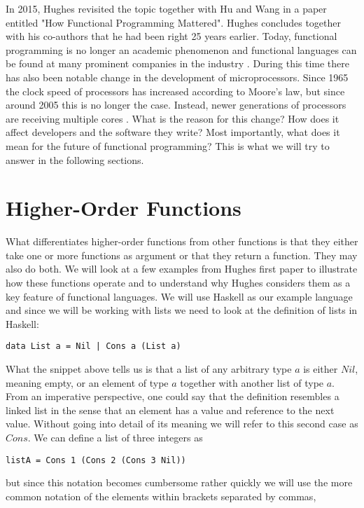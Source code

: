 \documentclass[conference]{IEEEtran}
\begin{document}
In 2015, Hughes revisited the topic together with Hu and Wang in a paper entitled "How Functional Programming Mattered". Hughes concludes together with his co-authors that he had been right 25 years earlier. Today, functional programming is no longer an academic phenomenon and functional languages can be found at many prominent companies in the industry \cite{how}. During this time there has also been notable change in the development of microprocessors. Since 1965 the clock speed of processors has increased according to Moore's law, but since around 2005 this is no longer the case. Instead, newer generations of processors are receiving multiple cores \cite{proc}. What is the reason for this change? How does it affect developers and the software they write? Most importantly, what does it mean for the future of functional programming? This is what we will try to answer in the following sections.


\section{Higher-Order Functions}
What differentiates higher-order functions from other functions is that they either take one or more functions as argument or that they return a function. They may also do both. We will look at a few examples from Hughes first paper to illustrate how these functions operate and to understand why Hughes considers them as a key feature of functional languages. We will use Haskell as our example language and since we will be working with lists we need to look at the definition of lists in Haskell:
\begin{lstlisting}[]
data List a = Nil | Cons a (List a)	
\end{lstlisting}
What the snippet above tells us is that a list of any arbitrary type $a$ is either $Nil$, meaning empty, or an element of type $a$ together with another list of type $a$. From an imperative perspective, one could say that the definition resembles a linked list in the sense that an element has a value and reference to the next value. Without going into detail of its meaning we will refer to this second case as $Cons$. We can define a list of three integers as

\begin{lstlisting}[]
listA = Cons 1 (Cons 2 (Cons 3 Nil))
\end{lstlisting}
but since this notation becomes cumbersome rather quickly we will use the more common notation of the elements within brackets separated by commas,
\end{document}
